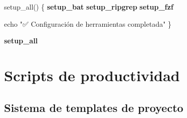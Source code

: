 \documentclass[
  11pt,
  letterpaper,
  oneside,
  openany]{scrbook}
\newenvironment{Shaded}{}{}
\newcommand{\BuiltInTok}[1]{\textcolor[rgb]{0.84,0.23,0.29}{#1}}
\newcommand{\ExtensionTok}[1]{\textcolor[rgb]{0.84,0.23,0.29}{\textbf{#1}}}
\newcommand{\FunctionTok}[1]{\textcolor[rgb]{0.44,0.26,0.76}{#1}}
\newcommand{\KeywordTok}[1]{\textcolor[rgb]{0.84,0.23,0.29}{#1}}
\newcommand{\StringTok}[1]{\textcolor[rgb]{0.01,0.18,0.38}{#1}}
\begin{document}
\begin{Shaded}
\begin{Highlighting}[]
\FunctionTok{setup\_all()} \KeywordTok{\{}
    \ExtensionTok{setup\_bat}
    \ExtensionTok{setup\_ripgrep}
    \ExtensionTok{setup\_fzf}
    
    \BuiltInTok{echo} \StringTok{"✅ Configuración de herramientas completada"}
\KeywordTok{\}}

\ExtensionTok{setup\_all}
\end{Highlighting}
\end{Shaded}

\section{Scripts de productividad}\label{scripts-de-productividad}

\subsection{Sistema de templates de
proyecto}\label{sistema-de-templates-de-proyecto}
\end{document}
